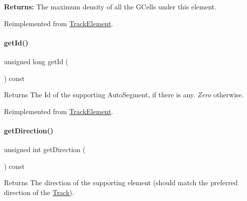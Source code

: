 {\bfseries Returns\+:} The maximum density of all the G\+Cells under this element. 

Reimplemented from \hyperlink{classKite_1_1TrackElement_aa34ceb4288e76357b65725ca00e56df8}{Track\+Element}.

\mbox{\label{classKite_1_1TrackSegment_afdedcef127ad2a3677a5b48d7d3453f3}} 
\paragraph{\texorpdfstring{get\+Id()}{getId()}}
{\footnotesize\ttfamily unsigned long get\+Id (\begin{DoxyParamCaption}{ }\end{DoxyParamCaption}) const\hspace{0.3cm}{\ttfamily [virtual]}}

\begin{DoxyReturn}{Returns}
The {\ttfamily Id} of the supporting Auto\+Segment, if there is any. {\itshape Zero} otherwise. 
\end{DoxyReturn}


Reimplemented from \hyperlink{classKite_1_1TrackElement_afdedcef127ad2a3677a5b48d7d3453f3}{Track\+Element}.

\mbox{\label{classKite_1_1TrackSegment_a0dd7cf705ace42c662c289955313b2e9}} 
\paragraph{\texorpdfstring{get\+Direction()}{getDirection()}}
{\footnotesize\ttfamily unsigned int get\+Direction (\begin{DoxyParamCaption}{ }\end{DoxyParamCaption}) const\hspace{0.3cm}{\ttfamily [virtual]}}

\begin{DoxyReturn}{Returns}
The direction of the supporting element (should match the preferred direction of the \hyperlink{classKite_1_1Track}{Track}). 
\end{DoxyReturn}


